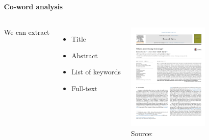 \documentclass[8pt]{beamer}
\begin{document}
\begin{frame}
\frametitle{\insertsection}
\framesubtitle{Co-word analysis}

\begin{columns}[c]


We can extract {\color{blue}{terms/keywords}}
\begin{itemize}
\item Title
\item Abstract
\item List of keywords
\item Full-text
\end{itemize}

\centering
\includegraphics[width=4cm, frame]{paper}\\
\tiny{Source: \cite{Rotolo2015}}

\end{columns}

\end{frame}

\end{document}
